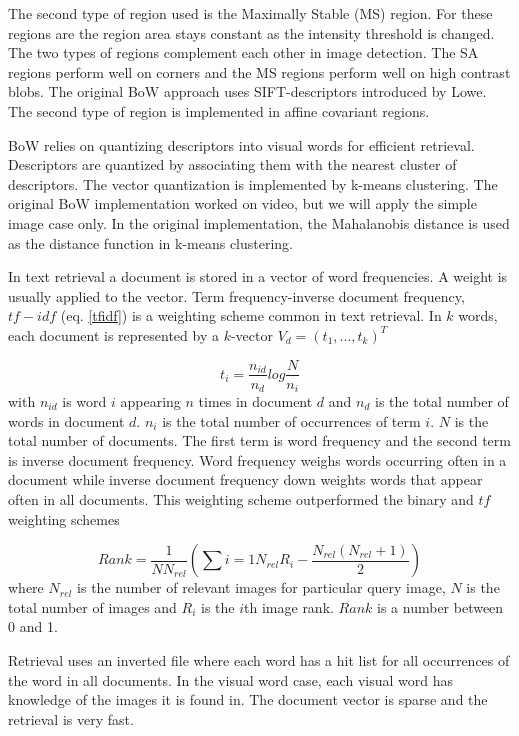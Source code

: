 \documentclass[english,12pt,a4paper,pdftex,elec,utf8, table]{aaltothesis}
\begin{document}
The second type of region used is the Maximally Stable (MS) region. For these regions are the region area stays constant as the intensity threshold is changed. The two types of regions complement each other in image detection. The SA regions perform well on corners and the MS regions perform well on high contrast blobs. \cite{Sivic2003} The original BoW approach uses SIFT-descriptors introduced by Lowe. The second type of region is implemented in affine covariant regions.

BoW relies on quantizing descriptors into visual words for efficient retrieval. Descriptors are quantized by associating them with the nearest cluster of descriptors. The vector quantization is implemented by k-means clustering. The original BoW implementation worked on video, but we will apply the simple image case only. In the original implementation, the Mahalanobis distance is used as the distance function in k-means clustering. \cite{Sivic2003}

In text retrieval a document is stored in a vector of word frequencies. A weight is usually applied to the vector. Term frequency-inverse document frequency, $tf-idf$ (eq. \ref{tfidf}) is a weighting scheme common in text retrieval. In $k$ words, each document is represented by a $k$-vector $V_{d}=(t_{1},...,t_{k})^{T}$

\begin{equation}\label{tfidf}
t_{i} = \frac{n_{id}}{n_{d}}log\frac{N}{n_{i}}
\end{equation}
with $n_{id}$ is word $i$ appearing $n$ times in document $d$ and $n_{d}$ is the total number of words in document $d$. $n_{i}$ is the total number of occurrences of term $i$. $N$ is the total number of documents. The first term is word frequency and the second term is inverse document frequency. Word frequency weighs words occurring often in a document while inverse document frequency down weights words that appear often in all documents. This weighting scheme outperformed the binary and $tf$ weighting schemes

\begin{equation}\label{bowrank}
  Rank = \frac{1}{NN_{rel}}\left(\sum{i=1}{N_{rel}}R_{i}-\frac{N_{rel}(N_{rel} + 1)}{2}\right)
\end{equation}
where $N_{rel}$ is the number of relevant images for particular query image, $N$ is the total number of images and $R_{i}$ is the $i$th image rank. $Rank$ is a number between 0 and 1. \cite{Sivic2003}

Retrieval uses an inverted file where each word has a hit list for all occurrences of the word in all documents. In the visual word case, each visual word has knowledge of the images it is found in. The document vector is sparse and the retrieval is very fast.
\end{document}

